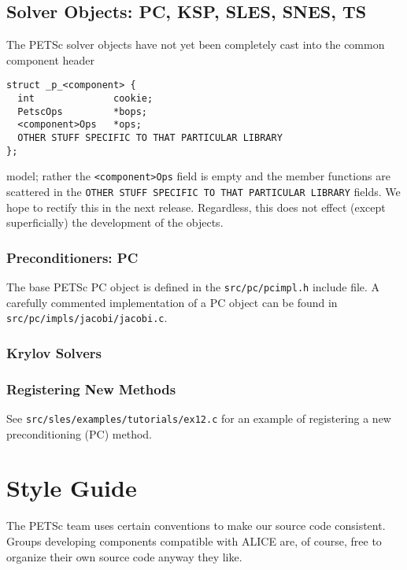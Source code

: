 \section{Solver Objects: PC, KSP, SLES, SNES, TS}

The PETSc solver objects have not yet been completely cast into the common component 
header 
\begin{verbatim}
struct _p_<component> {
  int              cookie;                                  
  PetscOps         *bops;                                   
  <component>Ops   *ops;       
  OTHER STUFF SPECIFIC TO THAT PARTICULAR LIBRARY
};
\end{verbatim}
model; rather the {\tt <component>Ops} field is empty and the member functions
are scattered in the {\tt OTHER STUFF SPECIFIC TO THAT PARTICULAR LIBRARY}
fields. We hope to rectify this in the next release. Regardless, this does not
effect (except superficially) the development of the objects.

\subsection{Preconditioners: PC}
The base PETSc PC object is defined in the {\tt src/pc/pcimpl.h} include file. 
A carefully commented implementation of a PC object can be found in 
{\tt src/pc/impls/jacobi/jacobi.c}. 

\subsection{Krylov Solvers}

\subsection{Registering New Methods}
\label{sec:registeringnewmethods}

See {\tt src/sles/examples/tutorials/ex12.c} for an example of registering a new
preconditioning (PC) method.


\chapter{Style Guide}

The PETSc team uses certain conventions to make our source code consistent. Groups
developing components compatible with ALICE are, of course, free to organize their
own source code anyway they like.

